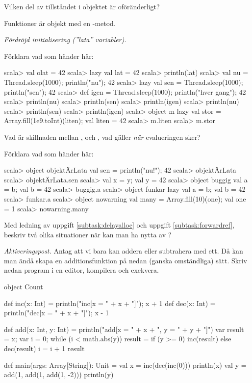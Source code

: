 \Subtask Vilken del av tillståndet i objektet är oföränderligt?



\Task Funktioner är objekt med en -metod.



\Task \emph{Fördröjd initialisering (''lata'' variabler).} 

\Subtask \label{subtask:delayalloc} Förklara vad som händer här:
\begin{REPL}
scala> val olat = 42
scala> lazy val lat = 42
scala> println(lat)
scala> val nu = {Thread.sleep(1000); println("nu"); 42}
scala> lazy val sen = {Thread.sleep(1000); println("sen"); 42}
scala> def igen = {Thread.sleep(1000); println("hver gang"); 42}
scala> println(nu)
scala> println(sen)
scala> println(igen)
scala> println(nu)
scala> println(sen)
scala> println(igen)
scala> object m {lazy val stor = Array.fill(1e9.toInt)(liten); val liten = 42}
scala> m.liten
scala> m.stor
\end{REPL}

\Subtask\Pen Vad är skillnaden mellan ,  och , vad gäller \emph{när} evalueringen sker?


\Subtask \label{subtask:forwardref} Förklara vad som händer här:
\begin{REPL}
scala> object objektÄrLata { val sen = { println("nu!"); 42 } }
scala> objektÄrLata
scala> objektÄrLata.sen
scala> {val x = y; val y = 42}
scala> object buggig {val a = b; val b = 42}
scala> buggig.a
scala> object funkar {lazy val a = b; val b = 42}
scala> funkar.a
scala> object nowarning {val many = Array.fill(10)(one); val one = 1}
scala> nowarning.many
\end{REPL}

\Subtask\Pen Med ledning av uppgift \ref{subtask:delayalloc} och uppgift \ref{subtask:forwardref}, beskriv två olika situationer när kan man ha nytta av ?


\Task \emph{Aktiveringspost.} Antag att vi bara kan addera eller subtrahera med ett. Då kan man ändå skapa en additionsfunktion på nedan (ganska omständliga) sätt. Skriv nedan program i en editor, kompilera och exekvera. 
\begin{Code}
object Count {
  def inc(x: Int) = {println("inc[x = " + x + "]"); x + 1}
  def dec(x: Int) = {println("dec[x = " + x + "]"); x - 1}

  def add(x: Int, y: Int) = {
    println("add[x = " + x + ", y = " + y + "]")
    var result = x; 
    var i = 0; 
    while (i < math.abs(y)){
      result = if (y >= 0) inc(result) else dec(result)
      i = i + 1
    }
    result
  }

  def main(args: Array[String]): Unit = {
    val x =  inc(dec(inc(0)))
    println(x)
    val y = add(1, add(1, add(1, -2)))
    println(y)
  }
}
\end{Code}

